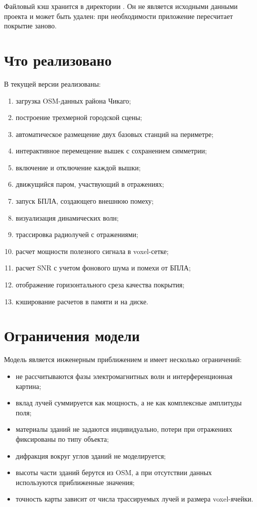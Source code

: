\documentclass[12pt,a4paper]{article}
\begin{document}
Файловый кэш хранится в директории . Он не является исходными данными проекта и может быть удален: при необходимости приложение пересчитает покрытие заново.

\section{Что реализовано}

В текущей версии реализованы:

\begin{enumerate}
    \item загрузка OSM-данных района Чикаго;
    \item построение трехмерной городской сцены;
    \item автоматическое размещение двух базовых станций на периметре;
    \item интерактивное перемещение вышек с сохранением симметрии;
    \item включение и отключение каждой вышки;
    \item движущийся паром, участвующий в отражениях;
    \item запуск БПЛА, создающего внешнюю помеху;
    \item визуализация динамических волн;
    \item трассировка радиолучей с отражениями;
    \item расчет мощности полезного сигнала в voxel-сетке;
    \item расчет SNR с учетом фонового шума и помехи от БПЛА;
    \item отображение горизонтального среза качества покрытия;
    \item кэширование расчетов в памяти и на диске.
\end{enumerate}

\section{Ограничения модели}

Модель является инженерным приближением и имеет несколько ограничений:

\begin{itemize}
    \item не рассчитываются фазы электромагнитных волн и интерференционная картина;
    \item вклад лучей суммируется как мощность, а не как комплексные амплитуды поля;
    \item материалы зданий не задаются индивидуально, потери при отражениях фиксированы по типу объекта;
    \item дифракция вокруг углов зданий не моделируется;
    \item высоты части зданий берутся из OSM, а при отсутствии данных используются приближенные значения;
    \item точность карты зависит от числа трассируемых лучей и размера voxel-ячейки.
\end{itemize}
\end{document}
